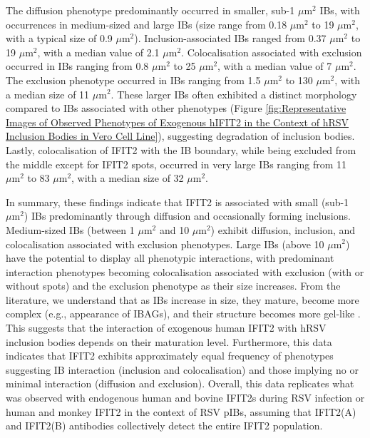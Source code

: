 The diffusion phenotype predominantly occurred in smaller, sub-1 $\mu \mbox{m}^2$ IBs, with occurrences in medium-sized and large IBs (size range from 0.18 $\mu \mbox{m}^2$ to 19 $\mu \mbox{m}^2$, with a typical size of 0.9 $\mu \mbox{m}^2$). Inclusion-associated IBs ranged from 0.37 $\mu \mbox{m}^2$ to 19 $\mu \mbox{m}^2$, with a median value of 2.1 $\mu \mbox{m}^2$. Colocalisation associated with exclusion occurred in IBs ranging from 0.8 $\mu \mbox{m}^2$ to 25 $\mu \mbox{m}^2$, with a median value of 7 $\mu \mbox{m}^2$. The exclusion phenotype occurred in IBs ranging from 1.5 $\mu \mbox{m}^2$ to 130 $\mu \mbox{m}^2$, with a median size of 11 $\mu \mbox{m}^2$. These larger IBs often exhibited a distinct morphology compared to IBs associated with other phenotypes (Figure \ref{fig:Representative Images of Observed Phenotypes of Exogenous hIFIT2 in the Context of hRSV Inclusion Bodies in Vero Cell Line}), suggesting degradation of inclusion bodies. Lastly, colocalisation of IFIT2 with the IB boundary, while being excluded from the middle except for IFIT2 spots, occurred in very large IBs ranging from 11 $\mu \mbox{m}^2$ to 83 $\mu \mbox{m}^2$, with a median size of 32 $\mu \mbox{m}^2$.

In summary, these findings indicate that IFIT2 is associated with small (sub-1 $\mu \mbox{m}^2$) IBs predominantly through diffusion and occasionally forming inclusions. Medium-sized IBs (between 1 $\mu \mbox{m}^2$ and 10 $\mu \mbox{m}^2$) exhibit diffusion, inclusion, and colocalisation associated with exclusion phenotypes. Large IBs (above 10 $\mu \mbox{m}^2$) have the potential to display all phenotypic interactions, with predominant interaction phenotypes becoming colocalisation associated with exclusion (with or without spots) and the exclusion phenotype as their size increases. From the literature, we understand that as IBs increase in size, they mature, become more complex (e.g., appearance of IBAGs), and their structure becomes more gel-like \cite{Weber1995NonstructuralSerum, Fricke2013P38Assembly, Rincheval2017FunctionalVirus, Jobe2021BovineResponses}. This suggests that the interaction of exogenous human IFIT2 with hRSV inclusion bodies depends on their maturation level. Furthermore, this data indicates that IFIT2 exhibits approximately equal frequency of phenotypes suggesting IB interaction (inclusion and colocalisation) and those implying no or minimal interaction (diffusion and exclusion). Overall, this data replicates what was observed with endogenous human and bovine IFIT2s during RSV infection or human and monkey IFIT2 in the context of RSV pIBs, assuming that IFIT2(A) and IFIT2(B) antibodies collectively detect the entire IFIT2 population.

